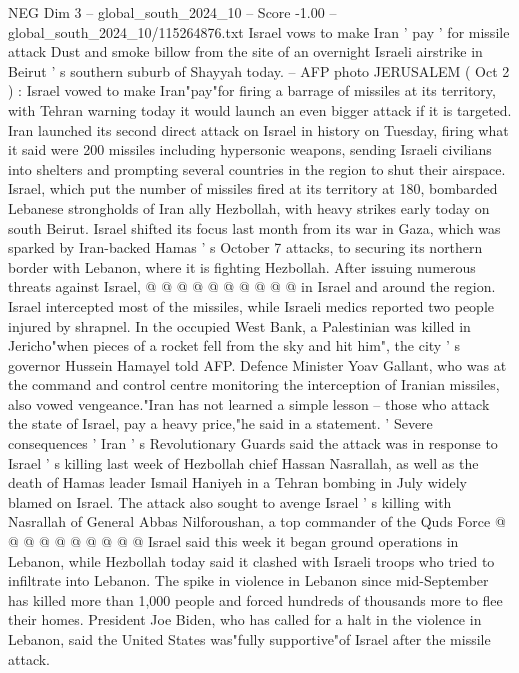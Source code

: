 \begin{textsample}{NEG Dim 3 – global\_south\_2024\_10 – Score -1.00 – global\_south\_2024\_10/115264876.txt}  \label{ex:f3_neg_051}
Israel vows to make Iran ' pay ' for missile attack Dust and smoke billow from the site of an overnight Israeli airstrike in Beirut ' s southern suburb of Shayyah today. -- AFP photo JERUSALEM ( Oct 2 ) : Israel vowed to make Iran"pay"for firing a barrage of missiles at its territory, with Tehran warning today it would launch an even bigger attack if it is targeted.
Iran launched its second direct attack on Israel in history on Tuesday, firing what it said were 200 missiles including hypersonic weapons, sending Israeli civilians into shelters and prompting several countries in the region to shut their airspace.
Israel, which put the number of missiles fired at its territory at 180, bombarded Lebanese strongholds of Iran ally Hezbollah, with heavy strikes early today on south Beirut.
Israel shifted its focus last month from its war in Gaza, which was sparked by Iran-backed Hamas ' s October 7 attacks, to securing its northern border with Lebanon, where it is fighting Hezbollah.
After issuing numerous threats against Israel, @ @ @ @ @ @ @ @ @ @ in Israel and around the region.
Israel intercepted most of the missiles, while Israeli medics reported two people injured by shrapnel.
In the occupied West Bank, a Palestinian was killed in Jericho"when pieces of a rocket fell from the sky and hit him", the city ' s governor Hussein Hamayel told AFP.
Defence Minister Yoav Gallant, who was at the command and control centre monitoring the interception of Iranian missiles, also vowed vengeance."Iran has not learned a simple lesson -- those who attack the state of Israel, pay a heavy price,"he said in a statement. ' Severe consequences ' Iran ' s Revolutionary Guards said the attack was in response to Israel ' s killing last week of Hezbollah chief Hassan Nasrallah, as well as the death of Hamas leader Ismail Haniyeh in a Tehran bombing in July widely blamed on Israel.
The attack also sought to avenge Israel ' s killing with Nasrallah of General Abbas Nilforoushan, a top commander of the Quds Force @ @ @ @ @ @ @ @ @ @ Israel said this week it began ground operations in Lebanon, while Hezbollah today said it clashed with Israeli troops who tried to infiltrate into Lebanon.
The spike in violence in Lebanon since mid-September has killed more than 1,000 people and forced hundreds of thousands more to flee their homes.
President Joe Biden, who has called for a halt in the violence in Lebanon, said the United States was"fully supportive"of Israel after the missile attack.

\end{textsample}
